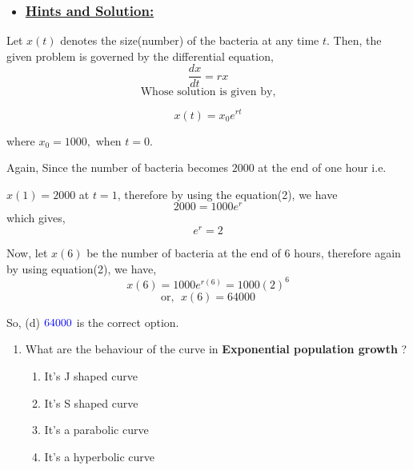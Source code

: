 \documentclass[12pt,a4paper]{article}
\begin{document}
    \begin{itemize}
        \item \subsubsection*{\underline{{\bf Hints and Solution:}}}
    \end{itemize}

    Let $x(t)$ denotes the size(number) of the bacteria at any time $t$. Then, the given problem is governed by the differential equation,
    \begin{equation*}
        \frac{dx}{dt} = rx \tag*{(1)}
    \end{equation*}
    \[\mbox{Whose solution is given by,}\]
    
    \begin{equation}
         x(t) = x_0 e^{rt} \tag*{(2)}
    \end{equation}

    where $x_0 = 1000,$ when $t = 0$.

    Again, Since the number of bacteria becomes $2000$ at the end of one hour i.e. 

    $x(1) = 2000$ at $t = 1$, therefore by using the equation(2), we have 
    \[2000 = 1000 e^{r}\]
    which gives, 
    \begin{equation*}
        e^r = 2 \tag*{(3)}
    \end{equation*}

    Now, let $x(6)$ be the number of bacteria at the end of $6$ hours, therefore again by using equation(2), we have,
    \[x(6) = 1000 e^{r(6)} = 1000(2)^6\]
    \[\mbox{or},\ \ x(6) = 64000\]

    So, (d)  $\color{blue}{64000}$ is the correct option.

    \pagebreak

    \vspace*{0.5cm}

    \begin{enumerate}[label=2.]
        \item What are the behaviour of the curve in {\bf Exponential population growth} ?
        \begin{enumerate}
            \item It's J shaped curve
            \item It's S shaped curve
            \item It's a parabolic curve
            \item It's a hyperbolic curve
        \end{enumerate}
    \end{enumerate}
\end{document}
